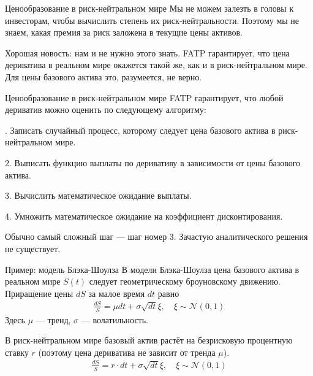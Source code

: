 \documentclass{beamer}
\begin{document}
\begin{frame}{Ценообразование в риск-нейтральном мире}
\justify
Мы не можем залезть в головы к инвесторам, чтобы вычислить степень их риск-нейтральности. Поэтому мы не знаем, какая премия за риск заложена в текущие цены активов.

\justify
Хорошая новость: нам и не нужно этого знать. FATP гарантирует, что цена дериватива в реальном мире окажется такой же, как и в риск-нейтральном мире. Для цены базового актива это, разумеется, не верно.
\end{frame}



\begin{frame}{Ценообразование в риск-нейтральном мире}
\justify
FATP гарантирует, что любой дериватив можно оценить 	по следующему алгоритму:

. Записать случайный процесс, которому следует цена базового актива в риск-нейтральном мире.

2. Выписать функцию выплаты по деривативу в зависимости от цены базового актива.

3. Вычислить математическое ожидание выплаты.

4. Умножить математическое ожидание на коэффициент дисконтирования.

\justify
Обычно самый сложный шаг --- шаг номер 3. Зачастую аналитического решения не существует.
\end{frame}



\begin{frame}{Пример: модель Блэка-Шоулза}
\justify
В модели Блэка-Шоулза цена базового актива в реальном мире $S(t)$ следует геометрическому броуновскому движению. Приращение цены $dS$ за малое время $dt$ равно
\begin{align*}
\frac{dS}{S} = \mu dt + \sigma \sqrt{dt} \xi, \quad \xi \sim \mathcal{N}(0,1) 
\end{align*}
Здесь $\mu$ --- тренд, $\sigma$ --- волатильность.

\justify
В риск-нейтральном мире базовый актив растёт на безрисковую процентную ставку $r$ (поэтому цена дериватива не зависит от тренда $\mu$).
\begin{align*}
\frac{dS}{S} = r \cdot dt + \sigma \sqrt{dt} \xi, \quad \xi \sim \mathcal{N}(0,1) 
\end{align*}
\end{frame}
\end{document}
